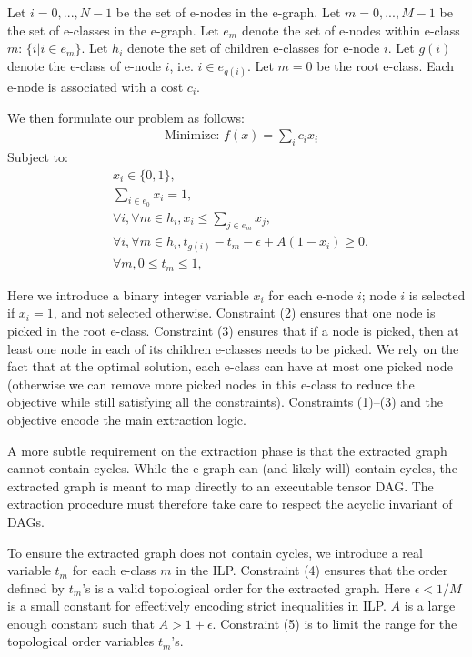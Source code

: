 Let $i = 0, ..., N-1$ be the set of e-nodes in the e-graph.
Let $m = 0, ..., M-1$ be the set of e-classes in the e-graph.
Let $e_m$ denote the set of e-nodes within e-class $m$: $\{i | i\in e_m \}$.
Let $h_i$ denote the set of children e-classes for e-node $i$.
Let $g(i)$ denote the e-class of e-node $i$, i.e. $i\in e_{g(i)}$.
Let $m=0$ be the root e-class.
Each e-node is associated with a cost $c_i$.

We then formulate our problem as follows:
\begin{align*}
    &\textrm{Minimize: } f(x) = \sum_{i} c_i x_i
\end{align*}
Subject to:
\begin{align}
    &x_i \in \{0, 1\}, \\
    &\sum_{i\in e_0} x_i = 1, \\
    &\forall i, \forall m \in h_i, x_i \leq \sum_{j\in e_m} x_j , \\
    & \forall i, \forall m \in h_i, t_{g(i)} - t_m - \epsilon + A (1 - x_i) \geq 0, \\
    &\forall m, 0 \leq t_m \leq 1,
\end{align}

Here we introduce a binary integer variable $x_i$ for each e-node $i$; node $i$ is selected if $x_i=1$, and not selected otherwise.
Constraint (2) ensures that one node is picked in the root e-class.
Constraint (3) ensures that if a node is picked, then at least one node in each of its children e-classes needs to be picked.
We rely on the fact that at the optimal solution, each e-class can have at most one picked node (otherwise we can remove more picked nodes in this e-class to reduce the objective while still satisfying all the constraints).
Constraints (1)--(3) and the objective encode the main extraction logic.

A more subtle requirement on the extraction phase is that the extracted graph cannot contain cycles.
While the e-graph can (and likely will) contain cycles, the extracted graph is meant to map directly to an executable tensor DAG.
The extraction procedure must therefore take care to respect the acyclic invariant of DAGs.

To ensure the extracted graph does not contain cycles, we introduce a real variable $t_m$ for each e-class $m$ in the ILP.
Constraint (4) ensures that the order defined by $t_m$'s is a valid topological order for the extracted graph.
Here $\epsilon < 1/M$ is a small constant for effectively encoding strict inequalities in ILP.
$A$ is a large enough constant such that $A > 1 + \epsilon$.
Constraint (5) is to limit the range for the topological order variables $t_m$'s.

